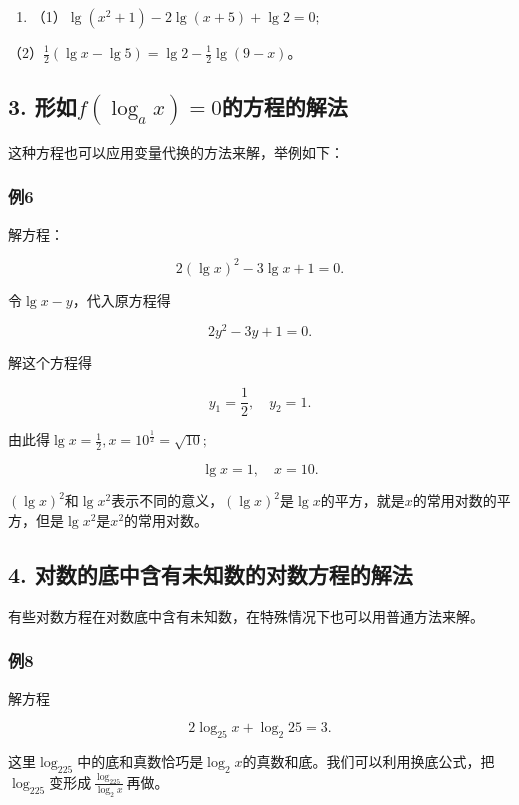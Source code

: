 \begin{enumerate}[start=4]
\item
  （1）\(\lg (x^2 + 1) - 2\lg (x + 5) + \lg 2 = 0;\)
\end{enumerate}

（2）\(\frac{1}{2} (\lg x - \lg 5) = \lg 2 - \frac{1}{2} \lg (9 - x)\)。

\subsection{\texorpdfstring{3. 形如\(f(\log_a x) = 0\)的方程的解法}{3. 形如f(\textbackslash log\_a x) = 0的方程的解法}}

这种方程也可以应用变量代换的方法来解，举例如下：

\subsubsection{例6}

解方程：

\[
2 (\lg x)^{2} - 3 \lg x + 1 = 0.
\]

 令\(\lg x - y\)，代入原方程得

\[
2 y^{2} - 3 y + 1 = 0.
\]

解这个方程得

\[
y_{1} = \frac{1}{2}, \quad y_{2} = 1.
\]

由此得\(\lg x = \frac{1}{2}, x = 10^{\frac{1}{2}} = \sqrt{10};\)

\[
\lg x = 1, \quad x = 10.
\]

\((\lg x)^2\)和\(\lg x^2\)表示不同的意义，\((\lg x)^2\)是\(\lg x\)的平方，就是\(x\)的常用对数的平方，但是\(\lg x^2\)是\(x^2\)的常用对数。

\subsection{4. 对数的底中含有未知数的对数方程的解法}

有些对数方程在对数底中含有未知数，在特殊情况下也可以用普通方法来解。

\subsubsection{例8}

解方程

\[
2 \log_{25} x + \log_{2} 25 = 3.
\]

这里\(\log_225\)中的底和真数恰巧是\(\log_2 x\)的真数和底。我们可以利用换底公式，把\(\log_225\)变形成\(\frac{\log_225}{\log_2 x}\)再做。

